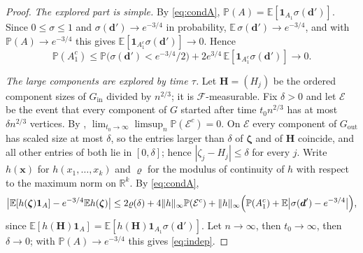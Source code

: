 \documentclass[11pt]{amsart}
\theoremstyle{remark}
\numberwithin{equation}{section}
\newcommand{\PP}{\mathbb{P}}
\newcommand{\EE}{\mathbb{E}}
\begin{document}
\begin{proof}
\emph{The explored part is simple.} By \eqref{eq:condA}, $\PP(A)=\EE[\mathbf 1_{A_1}\sigma(\boldsymbol d')]$. Since $0\le\sigma\le1$ and $\sigma(\boldsymbol d')\to e^{-3/4}$ in probability, $\EE\,\sigma(\boldsymbol d')\to e^{-3/4}$, and with $\PP(A)\to e^{-3/4}$ this gives $\EE[\mathbf 1_{A_1^c}\sigma(\boldsymbol d')]\to0$. Hence
\[
\PP(A_1^c)\le\PP\bigl(\sigma(\boldsymbol d')<e^{-3/4}/2\bigr)+2e^{3/4}\,\EE[\mathbf 1_{A_1^c}\sigma(\boldsymbol d')]\to0 .
\]

\emph{The large components are explored by time $\tau$.} Let $\boldsymbol H=(H_j)$ be the ordered component sizes of $G_{\mathrm{in}}$ divided by $n^{2/3}$; it is $\mathcal F$-measurable. Fix $\delta>0$ and let $\mathcal E$ be the event that every component of $G$ started after time $t_0n^{2/3}$ has at most $\delta n^{2/3}$ vertices. By \cite[Lemma~15]{DHLS17}, $\lim_{t_0\to\infty}\limsup_n\PP(\mathcal E^c)=0$. On $\mathcal E$ every component of $G_{\mathrm{out}}$ has scaled size at most $\delta$, so the entries larger than $\delta$ of $\boldsymbol\zeta$ and of $\boldsymbol H$ coincide, and all other entries of both lie in $[0,\delta]$; hence $|\zeta_j-H_j|\le\delta$ for every $j$. Write $h(\boldsymbol x)$ for $h(x_1,\dots,x_k)$ and $\varrho$ for the modulus of continuity of $h$ with respect to the maximum norm on $\mathbb R^k$. By \eqref{eq:condA},
\[
\bigl|\EE[h(\boldsymbol\zeta)\mathbf 1_A]-e^{-3/4}\EE h(\boldsymbol\zeta)\bigr|
\le 2\varrho(\delta)+4\|h\|_\infty\PP(\mathcal E^c)+\|h\|_\infty\Bigl(\PP(A_1^c)+\EE\bigl|\sigma(\boldsymbol d')-e^{-3/4}\bigr|\Bigr),
\]
since $\EE[h(\boldsymbol H)\mathbf 1_A]=\EE[h(\boldsymbol H)\mathbf 1_{A_1}\sigma(\boldsymbol d')]$. Let $n\to\infty$, then $t_0\to\infty$, then $\delta\to0$; with $\PP(A)\to e^{-3/4}$ this gives \eqref{eq:indep}.
\end{proof}
\end{document}
